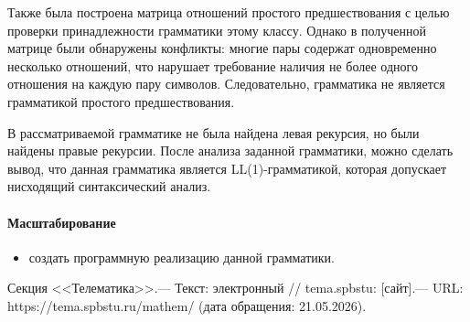 \documentclass[a4paper,final]{article}
\begin{document}
Также была построена матрица отношений простого предшествования с целью проверки принадлежности грамматики этому классу. Однако в полученной матрице были обнаружены конфликты: многие пары содержат одновременно несколько отношений, что нарушает требование наличия не более одного отношения на каждую пару символов. Следовательно, грамматика не является грамматикой простого предшествования.

В рассматриваемой грамматике не была найдена левая рекурсия, но были найдены правые рекурсии. После анализа заданной грамматики, можно сделать вывод, что данная грамматика является LL(1)-грамматикой, которая допускает нисходящий синтаксический анализ.

\paragraph{Масштабирование}\mbox{}
\begin{itemize}
    \item создать программную реализацию данной грамматики.
\end{itemize}

\newpage
{}
\begin{thebibliography}{}
     Секция <<Телематика>>.— Текст: электронный // tema.spbstu: [сайт].— URL: https://tema.spbstu.ru/mathem/ (дата обращения: 21.05.2026).
\end{thebibliography}

\end{document}
